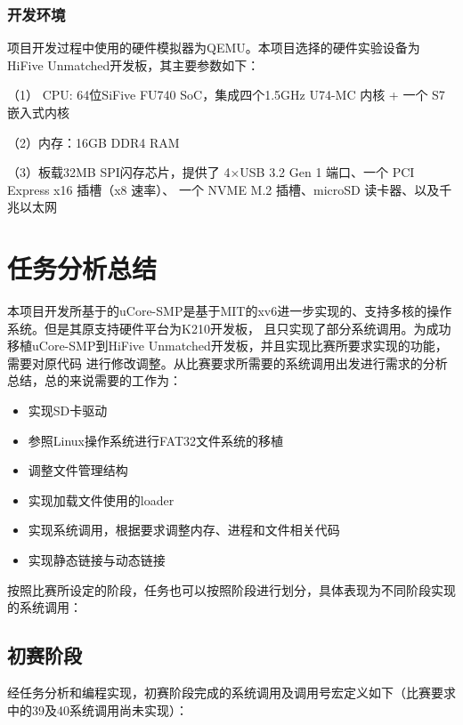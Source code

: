 \documentclass[UTF8,a4paper,10pt]{ctexart}
\begin{document}
\subsubsection{开发环境}

项目开发过程中使用的硬件模拟器为QEMU。本项目选择的硬件实验设备为HiFive Unmatched开发板，其主要参数如下：

（1） CPU: 64位SiFive FU740 SoC，集成四个1.5GHz U74-MC 内核 + 一个 S7 嵌入式内核

（2）内存：16GB DDR4 RAM

（3）板载32MB SPI闪存芯片，提供了 4×USB 3.2 Gen 1 端口、一个 PCI Express x16 插槽（x8 速率）、
一个 NVME M.2 插槽、microSD 读卡器、以及千兆以太网

\section{任务分析总结}

本项目开发所基于的uCore-SMP是基于MIT的xv6进一步实现的、支持多核的操作系统。但是其原支持硬件平台为K210开发板，
且只实现了部分系统调用。为成功移植uCore-SMP到HiFive Unmatched开发板，并且实现比赛所要求实现的功能，需要对原代码
进行修改调整。从比赛要求所需要的系统调用出发进行需求的分析总结，总的来说需要的工作为：

\begin{itemize}
  \item 实现SD卡驱动
  \item 参照Linux操作系统进行FAT32文件系统的移植
  \item 调整文件管理结构
  \item 实现加载文件使用的loader
  \item 实现系统调用，根据要求调整内存、进程和文件相关代码
  \item 实现静态链接与动态链接
\end{itemize}

按照比赛所设定的阶段，任务也可以按照阶段进行划分，具体表现为不同阶段实现的系统调用：

\subsection{初赛阶段}

经任务分析和编程实现，初赛阶段完成的系统调用及调用号宏定义如下（比赛要求中的39及40系统调用尚未实现）：
\end{document}
